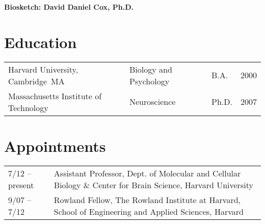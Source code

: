 \documentclass{nsfproposal}
\begin{document}
\begin{center}
{\large\textbf{Biosketch: David Daniel Cox, Ph.D.}}\\
\end{center}





\section{Education}

\begin{tabular}{ l l l r }
Harvard University, Cambridge~MA & Biology and Psychology & B.A. & 2000 \\
Massachusetts Institute of Technology & Neuroscience & Ph.D. & 2007 \\
\end{tabular}


\section{Appointments}


\begin{tabular}{p{2.5cm}p{11cm}}
7/12 -- present & Assistant Professor, Dept. of Molecular and Cellular Biology \& Center for Brain Science, Harvard University\\
9/07 -- 7/12 & Rowland Fellow, The Rowland Institute at Harvard, School of Engineering and Applied Sciences, Harvard
\end{tabular}
\end{document}
